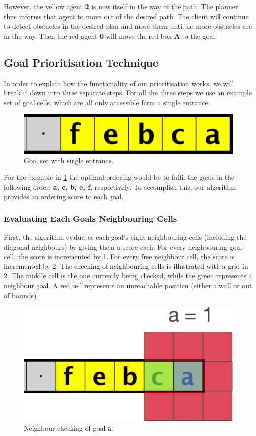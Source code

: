 However, the yellow agent \textbf{2} is now itself in the way of the path.
The planner thus informs that agent to move out of the desired path.
The client will continue to detect obstacles in the desired plan and move them until no more obstacles are in the way.
Then the red agent \textbf{0} will move the red box \textbf{A} to the goal.

\subsection{Goal Prioritisation Technique}
\label{methods:goal_ordering}

In order to explain how the functionality of our prioritisation works, we will break it down into three separate steps. For all the three steps we use an example set of goal cells, which are all only accessible form a single entrance.

\begin{figure}[h!]
  \centering
  \includegraphics[width=.5\columnwidth]{graphics/ie_level.png}
  \caption{\label{fig:sample}Goal set with single entrance.}
\end{figure}

For the example in \cref{fig:sample} the optimal ordering would be to fulfil the goals in the following order: \textbf{a, c, b, e, f}, respectively.
To accomplish this, our algorithm provides an ordering score to each goal.

\subsubsection{Evaluating Each Goals Neighbouring Cells}

First, the algorithm evaluates each goal's eight neighbouring cells (including the diagonal neighbours) by giving them a score each.
For every neighbouring goal-cell, the score is incremented by 1.
For every free neighbour cell, the score is incremented by 2.
The checking of neighbouring cells is illustrated with a grid in \cref{fig:grid1}.
The middle cell is the one currently being checked, while the green represents a neighbour goal.
A red cell represents an unreachable position (either a wall or out of bounds).

\begin{figure}[ht!]
  \centering
  \includegraphics[width=.5\columnwidth]{graphics/goal_pri_1.png}
  \caption{\label{fig:grid1}Neighbour checking of goal \textbf{a}.}
\end{figure}

